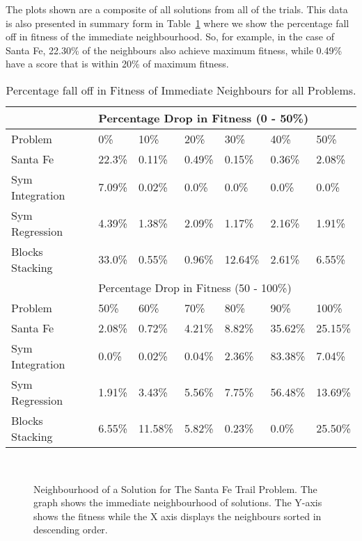 The plots shown are a composite of all solutions from all of the trials. This data is also presented in summary form in Table~\ref{neighbours_table} where we show the percentage fall off in fitness of the immediate neighbourhood. So, for example, in the case of Santa Fe, 22.30\% of the neighbours also  achieve maximum fitness, while 0.49\% have a score that is within 20\% of maximum fitness. 



\begin{table}[h]
\begin{center}
\begin{tabular}{|l|l|l|l|l|l|l|}
\hline
&\multicolumn{6}{|l|}{Percentage Drop in Fitness (0 - 50\%)}\\
\hline
Problem & 0\%  & 10\% & 20\% & 30\% & 40\% & 50\% \\
\hline
\hline
Santa Fe & 22.3\%  & 0.11\% & 0.49\% & 0.15\% & 0.36\% & 2.08\% \\
Sym Integration & 7.09\% & 0.02\% & 0.0\% & 0.0\% & 0.0\% & 0.0\%  \\
Sym Regression & 4.39\% & 1.38\% & 2.09\% & 1.17\% & 2.16\% & 1.91\% \\
Blocks Stacking & 33.0\% & 0.55\% & 0.96\% & 12.64\% & 2.61\% & 6.55\% \\
\hline
&\multicolumn{6}{|l|}{Percentage Drop in Fitness (50 - 100\%) }\\
\hline
Problem & 50\% & 60\% & 70\% & 80\% & 90\% & 100\% \\
\hline
\hline
Santa Fe & 2.08\% & 0.72\%  & 4.21\% & 8.82\% & 35.62\% & 25.15\%  \\
Sym Integration & 0.0\% & 0.02\% & 0.04\% & 2.36\% & 83.38\% & 7.04\% \\
Sym Regression & 1.91\% & 3.43\% & 5.56\% & 7.75\% & 56.48\% & 13.69\% \\
Blocks Stacking & 6.55\% & 11.58\% & 5.82\% & 0.23\% & 0.0\% & 25.50\% \\
\hline
\end{tabular}
\caption{\label{neighbours_table} Percentage fall off in Fitness of Immediate Neighbours for all Problems.}
\end{center}
\end{table}





\begin{figure}[]
\centerline{\hbox{
}}
\caption[Neighbourhood of a Solution for The Santa Fe Trail Problem.]{ Neighbourhood of a Solution for The Santa Fe Trail Problem. The graph shows the immediate neighbourhood of solutions. The Y-axis shows the fitness while the X axis displays the neighbours sorted in descending order.}
\label{santafe_neighbourhood}
\end{figure}


